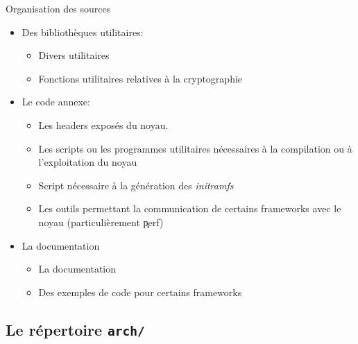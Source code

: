 \begin{frame}[fragile=singleslide]{Organisation des sources}
  \begin{itemize} 
  \item Des bibliothèques utilitaires:
    \begin{itemize} 
    \item {} Divers utilitaires
    \item   {}  Fonctions   utilitaires   relatives  à   la
      cryptographie
    \end{itemize} 
  \item Le code annexe:
    \begin{itemize} 
    \item {} Les headers exposés du noyau.
    \item  {} Les  scripts ou  les  programmes utilitaires
      nécessaires à la compilation ou à l'exploitation du noyau
    \item   {}   Script  nécessaire   à   la  génération   des
      \emph{initramfs}
    \item  {}  Les  outils  permettant la  communication  de
      certains frameworks avec le noyau (particulièrement \c{perf})
    \end{itemize} 
  \item La documentation
    \begin{itemize} 
    \item {} La documentation
    \item {} Des exemples de code pour certains frameworks
    \end{itemize} 
  \end{itemize} 
\end{frame} 

\subsection{Le répertoire \texttt{arch/}}

